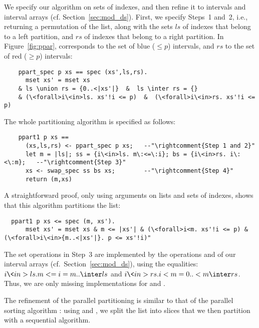 \documentclass[sn-mathphys,Numbered]{sn-jnl}
\theoremstyle{thmstyleone}%
\theoremstyle{definition}%
\theoremstyle{thmstylethree}%
\begin{document}
  We specify our algorithm on sets of indexes, and then refine it to intervals and interval arrays (cf. Section~\ref{sec:mod_ds}).
  First, we specify Steps~1 and~2, i.e., returning a permutation of the list, along with the sets \is$ls$ of
  indexes that belong to a left partition, and \is$rs$ of indexes that belong to a right partition. In Figure~\ref{fig:ppar},
   corresponds to the set of blue ($\le p$) intervals, and \is$rs$ to the set of red ($\ge p$) intervals:
  \begin{lstlisting}
    ppart_spec p xs == spec (xs',ls,rs).
      mset xs' = mset xs
    & ls \union rs = {0..<|xs'|}  &  ls \inter rs = {}
    & (\<forall>i\<in>ls. xs'!i <= p)  &  (\<forall>i\<in>rs. xs'!i <= p)
  \end{lstlisting}

  The whole partitioning algorithm is specified as follows:
  \begin{lstlisting}
    ppart1 p xs ==
      (xs,ls,rs) <- ppart_spec p xs;   --"\rightcomment{Step 1 and 2}"
      let m = |ls|; ss = {i\<in>ls. m\:<=\:i}; bs = {i\<in>rs. i\:<\:m};   --"\rightcomment{Step 3}"
      xs <- swap_spec ss bs xs;        --"\rightcomment{Step 4}"
      return (m,xs)
  \end{lstlisting}
  A straightforward proof, only using arguments on lists and sets of indexes, shows that this algorithm partitions the list:
  \begin{lstlisting}
  ppart1 p xs <= spec (m, xs').
      mset xs' = mset xs & m <= |xs'| & (\<forall>i<m. xs'!i <= p) & (\<forall>i\<in>{m..<|xs'|}. p <= xs'!i)"
  \end{lstlisting}

  The set operations in Step~3 are implemented by the operations  and  of our interval arrays (cf.~Section~\ref{sec:mod_ds}),
  using the equalities: \is$ {i\<in>ls. m<=i} = {m..} \inter ls$ and \is${i\<in>rs. i<m} = {0..<m} \inter rs$.
  Thus, we are only missing implementations for  and .

  The refinement of the parallel partitioning  is similar to that of the parallel sorting algorithm :
  using  and , we split the list into slices that we then partition with a sequential algorithm.
\end{document}
